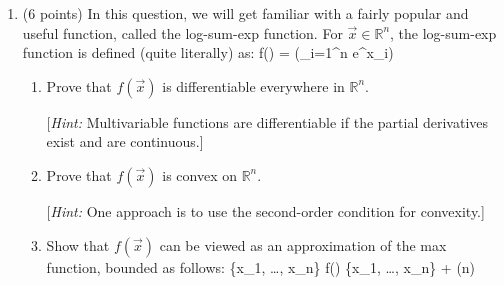 \begin{enumerate}[resume]
\pagebreak
\item
(6 points) In this question, we will get familiar with a fairly popular and useful function, called the log-sum-exp function. For $\vec{x} \in \mathbb{R}^n$, the log-sum-exp function is defined (quite literally) as:
\beqn
f() = \log\bigg(\sum_{i=1}^n e^{x_i}\bigg)
\eeqn
\begin{enumerate}
\item Prove that $f(\vec{x})$ is differentiable everywhere in $\mathbb{R}^n$.

[\emph{Hint:} Multivariable functions are differentiable if the partial derivatives exist and are continuous.]
\pagebreak
\item Prove that $f(\vec{x})$ is convex on $\mathbb{R}^n$.

[\emph{Hint:} One approach is to use the second-order condition for convexity.]
\pagebreak
\item Show that $f(\vec{x})$ can be viewed as an approximation of the max function, bounded as follows:
\beqn
\max\{x_1, \dots, x_n\} \le f() \le \max\{x_1, \dots, x_n\} + \log(n)
\eeqn
\pagebreak
\end{enumerate}
\end{enumerate}
